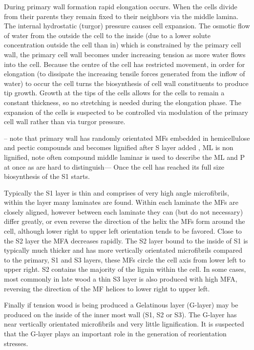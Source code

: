 \documentclass{article}
\begin{document}
During primary wall formation rapid elongation occurs. When the cells divide
from their parents they remain fixed to their neighbors via the middle lamina.
The internal hydrostatic (turgor) pressure causes cell expansion. The osmotic flow of
water from the outside the cell to the inside (due to a lower solute concentration
outside the cell than in) which is constrained by the primary cell wall, the
primary cell wall becomes under increasing tension as more water flows into
the cell. Because the centre of the cell has restricted movement, in order for
elongation (to dissipate the increasing tensile forces generated from the
inflow of water) to occur the cell turns the biosynthesis of cell wall
constituents to produce tip growth. Growth at the tips of the cells allows for
the cells to remain a constant thickness, so no stretching is needed during the
elongation phase. The expansion of the cells is
suspected to be controlled via modulation of the primary cell wall rather than
via turgor pressure.

-- note that primary wall has randomly orientated MFs embedded
in hemicellulose and pectic compounds and becomes lignified after S layer added
, ML is non lignified, note often compound middle laminar is used to describe
the ML and P at once as are hard to distinguish--- Once the cell has reached its
full size biosynthesis of the S1 starts.

Typically the S1 layer is thin and comprises of very high angle microfibrils,
within the layer many laminates are found. Within each laminate the MFs are
closely aligned, however between each laminate they can (but do not necessary)
differ greatly, or even reverse the direction of the helix the MFs form around
the cell, although lower right to upper left orientation tends to be favored.
Close to the S2 layer the MFA decreases rapidly.
The S2 layer bound to the inside of S1 is typically much thicker and has more
vertically orientated microfibrils compared to the primary, S1 and S3 layers,
these MFs circle the cell axis from lower left to upper right. S2 contains the majority of the lignin
within the cell. In some cases, most commonly in late wood a thin S3 layer is
also produced with high MFA, reversing the direction of the MF helices to lower
right to upper left.

Finally if tension wood is being produced a Gelatinous layer (G-layer)
may be produced on the inside of the inner most wall (S1, S2 or S3). The G-layer
has near vertically orientated microfibrils and very little lignification. It is suspected that the
G-layer plays an important role in the generation of reorientation stresses.
\end{document}
